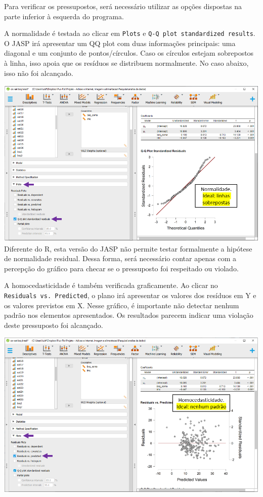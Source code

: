 \documentclass[
]{book}
\begin{document}
Para verificar os pressupostos, será necessário utilizar as opções dispostas na parte inferior à esquerda do programa.

A normalidade é testada ao clicar em \texttt{Plots} e \texttt{Q-Q\ plot\ standardized\ results}. O JASP irá apresentar um QQ plot com duas informações principais: uma diagonal e um conjunto de pontos/círculos. Caso os círculos estejam sobrepostos à linha, isso apoia que os resíduos se distribuem normalmente. No caso abaixo, isso não foi alcançado.

\includegraphics{./img/cap_reg_multipla_normalidade.png}
Diferente do R, esta versão do JASP não permite testar formalmente a hipótese de normalidade residual. Dessa forma, será necessário contar apenas com a percepção do gráfico para checar se o pressuposto foi respeitado ou violado.

A homocedasticidade é também verificada graficamente. Ao clicar no \texttt{Residuals\ vs.\ Predicted}, o plano irá apresentar os valores dos resíduos em Y e os valores previstos em X. Nesse gráfico, é importante não detectar nenhum padrão nos elementos apresentados. Os resultados parecem indicar uma violação deste pressuposto foi alcançado.

\includegraphics{./img/cap_reg_multipla_homocedasticidade.png}
\end{document}
